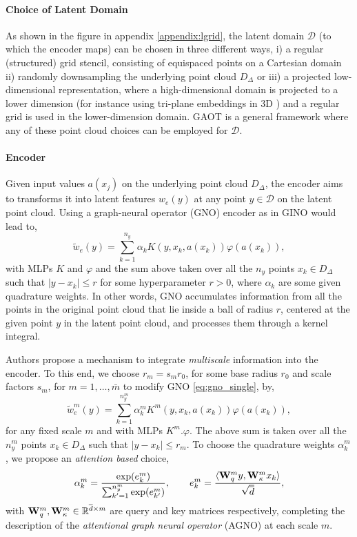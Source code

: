 \documentclass[reqno,10pt]{amsart}
\theoremstyle{plain}
\theoremstyle{definition}
\newcommand{\bb}[1]{\mathbb{#1}}
\newcommand{\cal}[1]{\mathcal{#1}}
\begin{document}
\paragraph{\bf Choice of Latent Domain} 
As shown in the figure in appendix \ref{appendix:lgrid}, the latent domain $\cal D$ (to which the encoder maps) can be chosen in three different ways, i) a regular (structured) grid stencil, consisting of equispaced points on a Cartesian domain ii) randomly downsampling the underlying point cloud $D_\Delta$ or iii) a projected low-dimensional representation, where a high-dimensional domain is projected to a lower dimension (for instance using tri-plane embeddings in 3D \cite{QC2025}) and a regular grid is used in the lower-dimension domain. GAOT is a general framework where any of these point cloud choices can be employed for $\cal D$.

\paragraph{\bf Encoder} Given input values $a(x_j)$ on the underlying point cloud $D_\Delta$, the encoder aims to transforms it into latent features $w_e(y)$ at any point $y \in \cal D$ on the latent point cloud. Using a graph-neural operator (GNO) encoder as in GINO \cite{ZL2023} would lead to,
\begin{equation}\label{eq:gno_single}
    \tilde{w}_e(y) = \sum_{k=1}^{n_y} \alpha_k K(y,x_k,a(x_k)) \varphi(a(x_k)),
\end{equation}
with MLPs $K$ and $\varphi$ and the sum above taken over all the $n_y$ points $x_k \in D_\Delta$ such that $|y-x_k| \leq r$ for some hyperparameter $r > 0$, where $\alpha_k$ are some given quadrature weights. In other words, GNO accumulates information from all the points in the original point cloud that lie inside a ball of radius $r$, centered at the given point $y$ in the latent point cloud, and processes them through a kernel integral.

\noindent Authors propose a mechanism to integrate {\it multiscale} information into the encoder. To this end, we choose $r_m = s_m r_0$, for some base radius $r_0$ and scale factors $s_m$, for $m = 1, \dots, \bar{m}$ to modify GNO \ref{eq:gno_single}, by,
\begin{equation}\label{eq:agno}
    \tilde{w}_e^m (y) = \sum_{k=1}^{n_y^m} \alpha_k^m K^m (y,x_k,a(x_k)) \varphi(a(x_k)),
\end{equation}
for any fixed scale $m$ and with MLPs $K^m. \varphi$. The above sum is taken over all the $n^m_y$ points $x_k \in D_\Delta$ such that $|y-x_k| \leq r_m$. To choose the quadrature weights $\alpha_k^m$, we propose an {\it attention based} choice,
\begin{equation}\label{eq:atten_weights}
    \alpha_k^m = \frac{\exp(e^m_k)}{\sum_{k'=1}^{n_y^m} \exp(e^m_{k'})}, \qquad e^m_k = \frac{\langle {\bf W}_q^m y,{\bf W}_\kappa^m x_k \rangle}{\sqrt{\overline{d}}},
\end{equation}
with ${\bf W}_q^m,{\bf W}_\kappa^m \in \bb R^{\overline{d} \times m}$ are query and key matrices respectively, completing the description of the {\it attentional graph neural operator} (AGNO) at each scale $m$.
\end{document}
